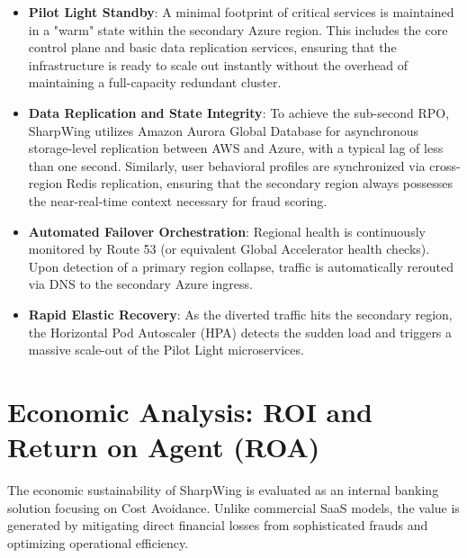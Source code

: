 \documentclass[12pt]{report}
\begin{document}
\begin{itemize}
    \item \textbf{Pilot Light Standby}: A minimal footprint of critical services is maintained in a "warm" state within the secondary Azure region. This includes the core control plane and basic data replication services, ensuring that the infrastructure is ready to scale out instantly without the overhead of maintaining a full-capacity redundant cluster.
    
    \item \textbf{Data Replication and State Integrity}: To achieve the sub-second RPO, SharpWing utilizes Amazon Aurora Global Database for asynchronous storage-level replication between AWS and Azure, with a typical lag of less than one second. Similarly, user behavioral profiles are synchronized via cross-region Redis replication, ensuring that the secondary region always possesses the near-real-time context necessary for fraud scoring.
    
    \item \textbf{Automated Failover Orchestration}: Regional health is continuously monitored by Route 53 (or equivalent Global Accelerator health checks). Upon detection of a primary region collapse, traffic is automatically rerouted via DNS to the secondary Azure ingress. 
    
    \item \textbf{Rapid Elastic Recovery}: As the diverted traffic hits the secondary region, the Horizontal Pod Autoscaler (HPA) detects the sudden load and triggers a massive scale-out of the Pilot Light microservices.

\end{itemize}

\chapter{Economic Analysis: ROI and Return on Agent (ROA)}
\label{ch:economic_analysis}

The economic sustainability of SharpWing is evaluated as an internal banking solution focusing on Cost Avoidance. Unlike commercial SaaS models, the value is generated by mitigating direct financial losses from sophisticated frauds and optimizing operational efficiency.
\end{document}
